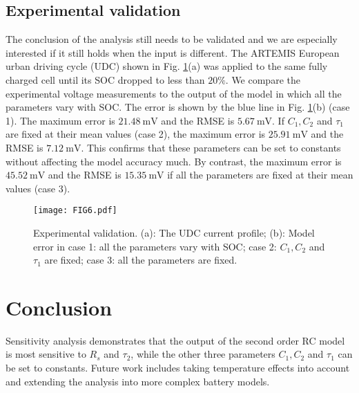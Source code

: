 \documentclass[letterpaper,twocolumn]{IEEEtran}
\begin{document}
\subsection{Experimental validation}


The conclusion of the analysis still needs to be validated and we are especially interested if it still holds when the input is different. The ARTEMIS European urban driving cycle (UDC) \cite{Andre2004} shown in Fig. \ref{fig:Figure6}(a) was applied to the same fully charged cell until its SOC dropped to less than $20\%$. We compare the experimental voltage measurements to the output of the model in which all the parameters vary with SOC. The error is shown by the blue line in Fig. \ref{fig:Figure6}(b) (case 1). The maximum  error is $\SI{21.48} {\milli\volt}$ and the RMSE is $\SI{5.67} {\milli\volt}$. If $C_1, C_2$ and $\tau_1$ are fixed at their mean values (case 2), the maximum  error is $\SI{25.91} {\milli\volt}$ and the RMSE is $\SI{7.12} {\milli\volt}$. This confirms that these parameters can be set to constants without affecting the model accuracy much. By contrast, the maximum  error is $\SI{45.52} {\milli\volt}$ and the RMSE is $\SI{15.35} {\milli\volt}$ if all the parameters are fixed at their mean values (case 3).

\begin{figure}
\centering
\texttt{[image: FIG6.pdf]}
\caption{Experimental validation. (a): The UDC current profile; (b): Model error in case 1: all the parameters vary with SOC; case 2: $C_1, C_2$ and $\tau_1$ are fixed; case 3: all the parameters are fixed.}
\label{fig:Figure6}
\end{figure}

\section{Conclusion}
Sensitivity analysis demonstrates that the output of the second order RC model is most sensitive to $R_s$ and $\tau_2$, while the other three parameters $C_1, C_2$ and $\tau_1$ can be set to constants. Future work includes taking temperature effects into account and extending the analysis into more complex battery models.
\end{document}
